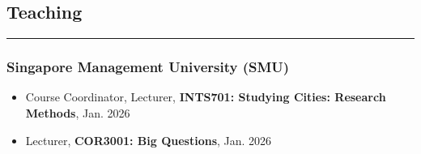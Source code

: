 \documentclass[10pt,a4paper]{article}
\begin{document}
\begin{small}







\subsection*{Teaching}
\hrule
\vspace{0.2cm}

\subsubsection*{Singapore Management University (SMU)}
\begin{itemize}
\item Course Coordinator, Lecturer, \textbf{INTS701: Studying Cities: Research Methods}, Jan. 2026%
\item Lecturer, \textbf{COR3001: Big Questions}, Jan. 2026%
\end{itemize}


\end{small}
\end{document}
